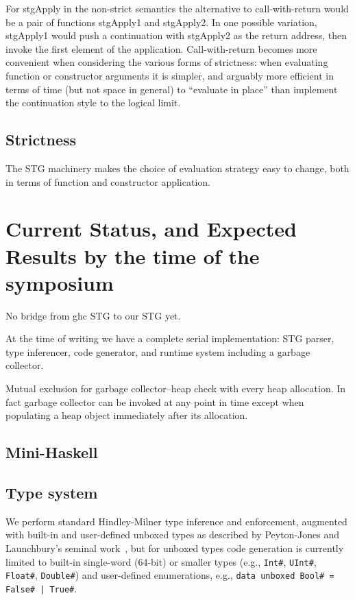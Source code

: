 \documentclass{llncs}
\begin{document}
For stgApply in the non-strict semantics the alternative to call-with-return
would be a pair of functions stgApply1 and stgApply2.  In one possible variation, 
stgApply1 would push a continuation with stgApply2 as the return address, then
invoke the first element of the application.  Call-with-return becomes more
convenient when considering the various forms of strictness:  when evaluating
function or constructor arguments it is simpler, and arguably more efficient
in terms of time (but not space in general) to ``evaluate in place'' than
implement the continuation style to the logical limit.

\subsection{Strictness}

The STG machinery makes the choice of evaluation strategy easy to change, both
in terms of function and constructor application.


\section{Current Status, and Expected Results by the time of the symposium}

No bridge from ghc STG to our STG yet.

At the time of writing we have a complete serial implementation:  STG parser, type inferencer, code
generator, and runtime system including a garbage collector.

Mutual exclusion for garbage collector--heap check with every heap allocation.  In fact garbage collector
can be invoked at any point in time except when populating a heap object immediately after its allocation.

\subsection{Mini-Haskell}

\subsection{Type system}

We perform standard Hindley-Milner type inference and enforcement, augmented
with built-in and user-defined unboxed types as described by Peyton-Jones and
Launchbury's seminal work~\cite{unboxed}, but for unboxed types code
generation is currently limited to built-in single-word (64-bit) or smaller
types (e.g., \texttt{Int\#}, \texttt{UInt\#}, \texttt{Float\#}, \texttt{Double\#})
and user-defined enumerations, e.g., \texttt{data unboxed Bool\# = False\# |
  True\#}.
\end{document}
